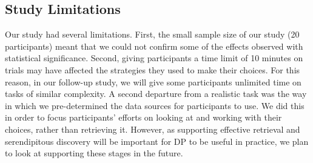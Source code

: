 \documentclass{sigchi}
\begin{document}
\subsection{Study Limitations}

Our study had several limitations.  First, the small sample size of our study (20 participants) meant that we could not confirm some of the effects observed with statistical significance.  Second, giving participants a time limit of 10 minutes on trials may have affected the strategies they used to make their choices.  For this reason, in our follow-up study, we will give some participants unlimited time on tasks of similar complexity.  A second departure from a realistic task was the way in which we pre-determined the data sources for participants to use.  We did this in order to focus participants' efforts on looking at and working with their choices, rather than retrieving it.  However, as supporting effective retrieval and serendipitous discovery will be important for DP to be useful in practice, we plan to look at supporting these stages in the future. 





\end{document}
